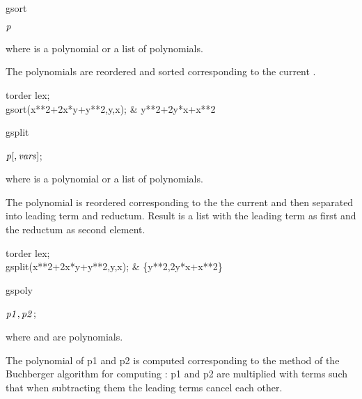 \begin{Operator}{gsort}
\begin{Syntax}

 \(\meta{p}\)
\end{Syntax}
where  is a polynomial or a list of polynomials.

The polynomials are reordered and sorted corresponding to
the current .
\begin{Examples}

  torder lex;\\  
  gsort(x**2+2x*y+y**2,{y,x});  &  {y**2+2y*x+x**2}

\end{Examples}
\end{Operator}


\begin{Operator}{gsplit}
\begin{Syntax}

 \(\meta{p}[,\meta{vars}]\);
\end{Syntax}
where  is a polynomial or a list of polynomials.

The polynomial is reordered corresponding to the 
the current  and then
separated into leading term and reductum. Result is
a list with the leading term as first and the reductum
as second element.
\begin{Examples}

  torder lex;\\  
  gsplit(x**2+2x*y+y**2,{y,x});  &  \{y**2,2y*x+x**2\}

\end{Examples}
\end{Operator}

\begin{Operator}{gspoly}
\begin{Syntax}

 \(\meta{p1},\meta{p2}\);

\end{Syntax}
where  and  are polynomials.

The  polynomial of p1 and p2 is computed
corresponding to the method of the Buchberger algorithm for
computing : p1 and p2 are multiplied
with terms such that when subtracting them the leading terms 
cancel each other.
\end{Operator}

